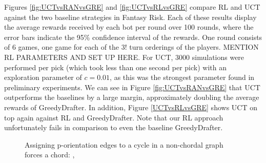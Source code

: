 \documentclass[letterpaper]{article}
\numberwithin{equation}{section}
\numberwithin{theorem}{section}
\numberwithin{lemma}{section}
\numberwithin{df}{section}
\begin{document}
Figures \ref{fig:UCTvsRANvsGRE} and \ref{fig:UCTvsRLvsGRE} compare RL and UCT against the two baseline strategies in Fantasy Risk.  Each of these results display the average rewards received by each bot per round over 100 rounds, where the error bars indicate the 95\% confidence interval of the rewards.  One round consists of 6 games, one game for each of the $3!$ turn orderings of the players.  MENTION RL PARAMETERS AND SET UP HERE.  For UCT, 3000 simulations were performed per pick (which took less than one second per pick) with an exploration parameter of $c=0.01$, as this was the strongest parameter found in preliminary experiments.  We can see in Figure \ref{fig:UCTvsRANvsGRE} that UCT outperforms the baselines by a large margin, approximately doubling the average rewards of GreedyDrafter.  In addition, Figure \ref{UCTvsRLvsGRE} shows UCT on top again against RL and GreedyDrafter.  Note that our RL approach unfortunately fails in comparison to even the baseline GreedyDrafter.  

\begin{figure}[ht]
\centering
{}\hspace{5pt}
\label{fig:subfigureExample}
\caption[]{Assigning p-orientation edges to a cycle in a non-chordal graph forces a chord: , }
\end{figure}
\end{document}
